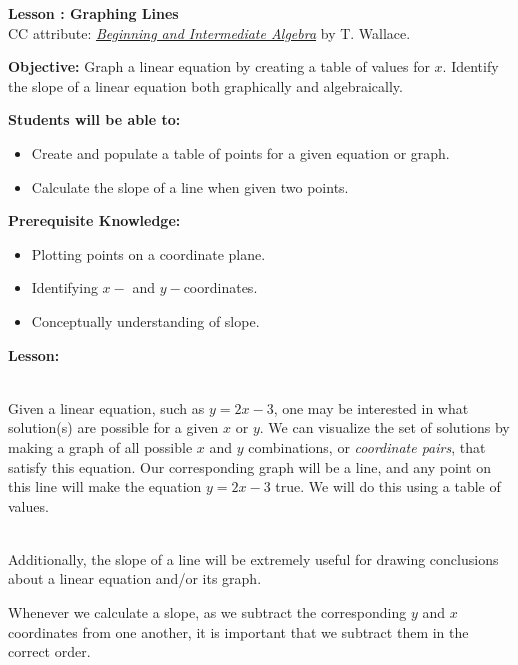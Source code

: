 \documentclass[12pt]{article}
\theoremstyle{definition}
\begin{document}
{\bf \large Lesson : Graphing Lines}
\\ CC attribute: \href{http://www.wallace.ccfaculty.org/book/book.html}{\it{Beginning and Intermediate Algebra}} by T. Wallace. 
\hfill \doclicenseImage[imagewidth=5em]\\
\par
{\bf Objective:} Graph a linear equation by creating a table of values for $x$.  Identify the slope of a linear equation both graphically and algebraically.\\
\par
{\bf Students will be able to:}
\begin{itemize}
	\item Create and populate a table of points for a given equation or graph.
	\item Calculate the slope of a line when given two points.
\end{itemize}
{\bf Prerequisite Knowledge:}
\begin{itemize}
	\item Plotting points on a coordinate plane.
	\item Identifying $x-$ and $y-$coordinates.
	\item Conceptually understanding of slope.
\end{itemize}
\hrulefill

{\bf Lesson:}\\
\ \par
Given a linear equation, such as $y = 2 x - 3$, one may be interested in what solution(s) are possible for a given $x$ or $y$.  We can visualize the set of solutions by making a graph of all possible $x$ and  $y$ combinations, or {\it coordinate pairs}, that satisfy this equation.  Our corresponding graph will be a line, and any point on this line will make the equation $y = 2 x - 3$ true.  We will do this using a table of values.\\
\ \par
Additionally, the slope of a line will be extremely useful for drawing conclusions about a linear equation and/or its graph.
\begin{center}
\end{center}
Whenever we calculate a slope, as we subtract the corresponding $y$ and $x$ coordinates from one another, it is important that we subtract them in the correct order.
\end{document}
